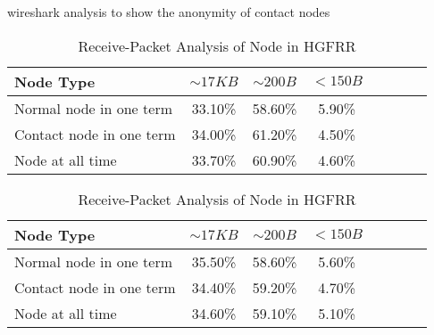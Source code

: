 wireshark analysis to show the anonymity of contact nodes

\begin{table} \label{packet}
	\begin{tabular}{l*{6}{c}r}
		Node Type & $\sim17 KB$ & $\sim200 B$ & $<150 B$ \\
		\hline		
		Normal node in one term & 33.10\%	& 58.60\% & 5.90\% \\
		Contact node in one term & 34.00\%	& 61.20\% &4.50\%  \\
		Node at all time  & 33.70\%	& 60.90\% &4.60\%  \\
	\end{tabular}
	\caption{Send-Packet Analysis of Node in HGFRR}
	\vspace{2mm}
	\begin{tabular}{l*{6}{c}r}
		Node Type & $\sim17 KB$ & $\sim200 B$ & $<150 B$ \\
		\hline		
		Normal node in one term & 35.50\% & 58.60\% & 5.60\% \\
		Contact node in one term & 34.40\% & 59.20\% & 4.70\%  \\
		Node at all time  & 34.60\% & 59.10\% & 5.10\%  \\
	\end{tabular}
	\caption{Receive-Packet Analysis of Node in HGFRR}
\end{table}
